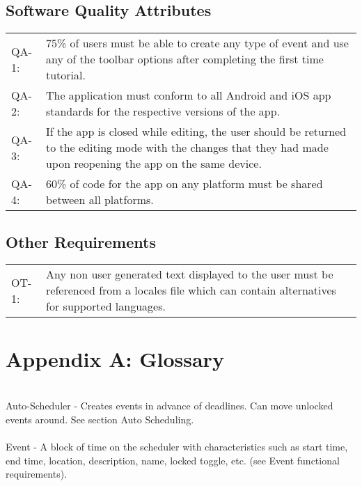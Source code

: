 \documentclass{scrreprt}
\begin{document}
\section{Software Quality Attributes}
\begin{center}
\begin{tabular}{ p{1.5cm} p{13cm} }
QA-1: & 75\% of users must be able to create any type of event and use any of the
toolbar options after completing the first time tutorial.\\
QA-2: & The application must conform to all Android and iOS app standards for the
respective versions of the app.\\
QA-3: & If the app is closed while editing, the user should be returned to the editing
mode with the changes that they had made upon reopening the app on the same device.\\
QA-4: & 60\% of code for the app on any platform must be shared between all platforms.
\end{tabular}
\end{center}

\section{Other Requirements}
\begin{center}
\begin{tabular}{ p{1.5cm} p{13cm} }
OT-1: & Any non user generated text displayed to the user must be referenced from
a locales file which can contain alternatives for supported languages.\\
\end{tabular}
\end{center}

\chapter{Appendix A: Glossary}
\\
Auto-Scheduler - Creates events in advance of deadlines. Can move unlocked events around.
See section Auto Scheduling.\\
\\
Event - A block of time on the scheduler with characteristics such as start time, end time, 
location, description, name, locked toggle, etc. (see Event functional requirements).\\
\\
\end{document}
